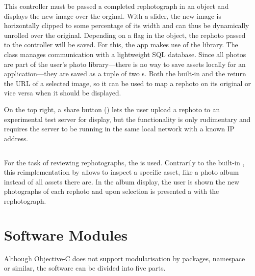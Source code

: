 This controller must be passed a completed rephotograph in an 
object and displays the new image over the orginal.  With a slider, the new
image is horizontally clipped to some percentage of its width and can thus be
dynamically unrolled over the original. Depending on a flag in the
 object, the rephoto passed to the controller will be saved. For
this, the app makes use of the  library. The  class
manages communication with a lightweight SQL database. Since all photos are part
of the user's photo library---there is no way to save assets locally for an
application---they are saved as a tuple of two s. Both the built-in
 and the  return
the URL of a selected image, so it can be used to map a rephoto on its original
or vice versa when it should be displayed.


On the top right, a share button ()
lets the user upload a rephoto to an experimental test server for display, but the
functionality is only rudimentary and requires the server to be running in the
same local network with a known IP address.

\subsection{}

For the task of reviewing rephotographs, the  is
used. Contrarily to the built-in , this
reimplementation by \citet{nutting2013} allows to inspect a specific asset, like
a photo album instead of all assets there are. In the album display, the user is
shown the new photographs of each rephoto and upon selection is presented a
 with the rephotograph.


\section{Software Modules}

Although Objective-C does not support modularisation by packages, namespace or
similar, the software can be divided into five parts.

